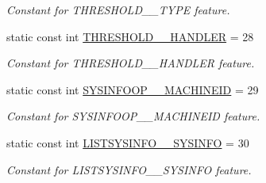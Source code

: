 \begin{DoxyCompactItemize}
\begin{DoxyCompactList}\small\item\em Constant for THRESHOLD\_\-\_\-TYPE feature. \item\end{DoxyCompactList}\item 
\hypertarget{classIMS__Data_1_1IMS__DataPackage_af825427ef06be98d6115dde141ef95dd}{
static const int \hyperlink{classIMS__Data_1_1IMS__DataPackage_af825427ef06be98d6115dde141ef95dd}{THRESHOLD\_\-\_\-HANDLER} = 28}
\label{classIMS__Data_1_1IMS__DataPackage_af825427ef06be98d6115dde141ef95dd}

\begin{DoxyCompactList}\small\item\em Constant for THRESHOLD\_\-\_\-HANDLER feature. \item\end{DoxyCompactList}\item 
\hypertarget{classIMS__Data_1_1IMS__DataPackage_a62704a5b4e8996c4b08d457998dfcfe5}{
static const int \hyperlink{classIMS__Data_1_1IMS__DataPackage_a62704a5b4e8996c4b08d457998dfcfe5}{SYSINFOOP\_\-\_\-MACHINEID} = 29}
\label{classIMS__Data_1_1IMS__DataPackage_a62704a5b4e8996c4b08d457998dfcfe5}

\begin{DoxyCompactList}\small\item\em Constant for SYSINFOOP\_\-\_\-MACHINEID feature. \item\end{DoxyCompactList}\item 
\hypertarget{classIMS__Data_1_1IMS__DataPackage_a06103a9cf7ddf79e38f951a8bc836530}{
static const int \hyperlink{classIMS__Data_1_1IMS__DataPackage_a06103a9cf7ddf79e38f951a8bc836530}{LISTSYSINFO\_\-\_\-SYSINFO} = 30}
\label{classIMS__Data_1_1IMS__DataPackage_a06103a9cf7ddf79e38f951a8bc836530}

\begin{DoxyCompactList}\small\item\em Constant for LISTSYSINFO\_\-\_\-SYSINFO feature. \item\end{DoxyCompactList}\end{DoxyCompactItemize}
